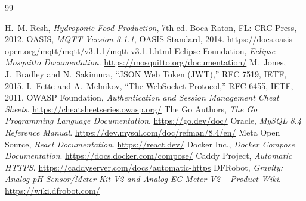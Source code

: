 \documentclass[11pt,a4paper,oneside]{report}
\begin{document}
\begin{thebibliography}{99}
\setlength{\itemsep}{1pt}
\small
{} H.~M. Resh, \emph{Hydroponic Food Production}, 7th ed. Boca Raton, FL: CRC Press, 2012.
 OASIS, \emph{MQTT Version 3.1.1}, OASIS Standard, 2014. \url{https://docs.oasis-open.org/mqtt/mqtt/v3.1.1/mqtt-v3.1.1.html}
 Eclipse Foundation, \emph{Eclipse Mosquitto Documentation}. \url{https://mosquitto.org/documentation/}
 M.~Jones, J.~Bradley and N.~Sakimura, ``JSON Web Token (JWT),'' RFC 7519, IETF, 2015.
 I.~Fette and A.~Melnikov, ``The WebSocket Protocol,'' RFC 6455, IETF, 2011.
 OWASP Foundation, \emph{Authentication and Session Management Cheat Sheets}. \url{https://cheatsheetseries.owasp.org/}
 The Go Authors, \emph{The Go Programming Language Documentation}. \url{https://go.dev/doc/}
 Oracle, \emph{MySQL 8.4 Reference Manual}. \url{https://dev.mysql.com/doc/refman/8.4/en/}
 Meta Open Source, \emph{React Documentation}. \url{https://react.dev/}
 Docker Inc., \emph{Docker Compose Documentation}. \url{https://docs.docker.com/compose/}
 Caddy Project, \emph{Automatic HTTPS}. \url{https://caddyserver.com/docs/automatic-https}
 DFRobot, \emph{Gravity: Analog pH Sensor/Meter Kit V2 and Analog EC Meter V2 -- Product Wiki}. \url{https://wiki.dfrobot.com/}
\end{thebibliography}
\end{document}
